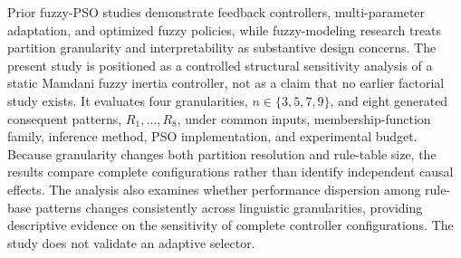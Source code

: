 Prior fuzzy-PSO studies demonstrate feedback controllers, multi-parameter adaptation, and optimized fuzzy policies, while fuzzy-modeling research treats partition granularity and interpretability as substantive design concerns. The present study is positioned as a controlled structural sensitivity analysis of a static Mamdani fuzzy inertia controller, not as a claim that no earlier factorial study exists. It evaluates four granularities, $n \in \{3,5,7,9\}$, and eight generated consequent patterns, $R_1,\ldots,R_8$, under common inputs, membership-function family, inference method, PSO implementation, and experimental budget. Because granularity changes both partition resolution and rule-table size, the results compare complete configurations rather than identify independent causal effects. The analysis also examines whether performance dispersion among rule-base patterns changes consistently across linguistic granularities, providing descriptive evidence on the sensitivity of complete controller configurations. The study does not validate an adaptive selector.
